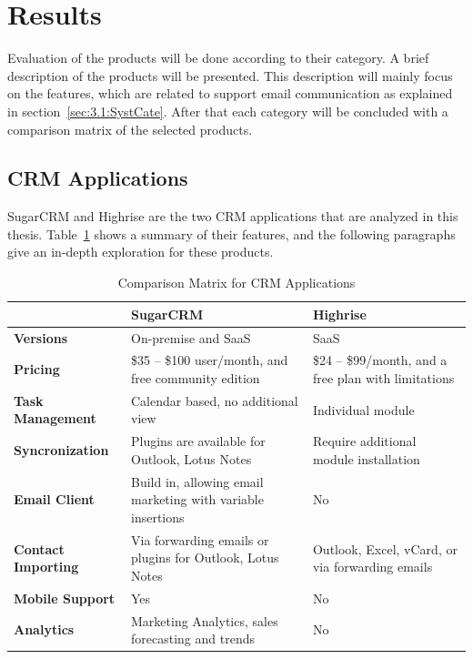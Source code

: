 \section{Results}
\label{sec:3.3:Resul}
Evaluation of the products will be done according to their category. A brief description of the products will be presented. This description will mainly focus on the features, which are related to support email communication as explained in section~\ref{sec:3.1:SystCate}. After that each category will be concluded with a comparison matrix of the selected products.

\subsection{CRM Applications}
\label{subsec:3.3.1:CRMAppl}

SugarCRM and Highrise are the two \ac{CRM} applications that are analyzed in this thesis. Table~\ref{tab:comp_matr_crm} shows a summary of their features, and the following paragraphs give an in-depth exploration for these products.

\begin{table}[!ht]
\begin{center}
	\caption[Comparison Matrix for CRM Applications]{Comparison Matrix for CRM Applications} \label{tab:comp_matr_crm}
    \begin{tabular}{ | p{3cm} | p{5cm} | p{5cm} | }
	\hline
	& \textbf{SugarCRM} & \textbf{Highrise} \\ \hline
	\textbf{Versions} & On-premise and SaaS & SaaS \\ \hline
	\textbf{Pricing} & \$35 -- \$100 user/month, and free community edition & \$24 -- \$99/month, and a free plan with limitations \\ \hline
	\textbf{Task Management} & Calendar based, no additional view & Individual module \\ \hline
	\textbf{Syncronization} & Plugins are available for Outlook, Lotus Notes & Require additional module installation \\ \hline
	\textbf{Email Client} & Build in, allowing email marketing with variable insertions & No \\ \hline
	\textbf{Contact Importing} & Via forwarding emails or plugins for Outlook, Lotus Notes & Outlook, Excel, vCard, or via forwarding emails \\ \hline
	\textbf{Mobile Support} & Yes & No \\ \hline
	\textbf{Analytics} & Marketing Analytics, sales forecasting and trends & No \\ \hline
    \end{tabular}
\end{center}
\end{table}


